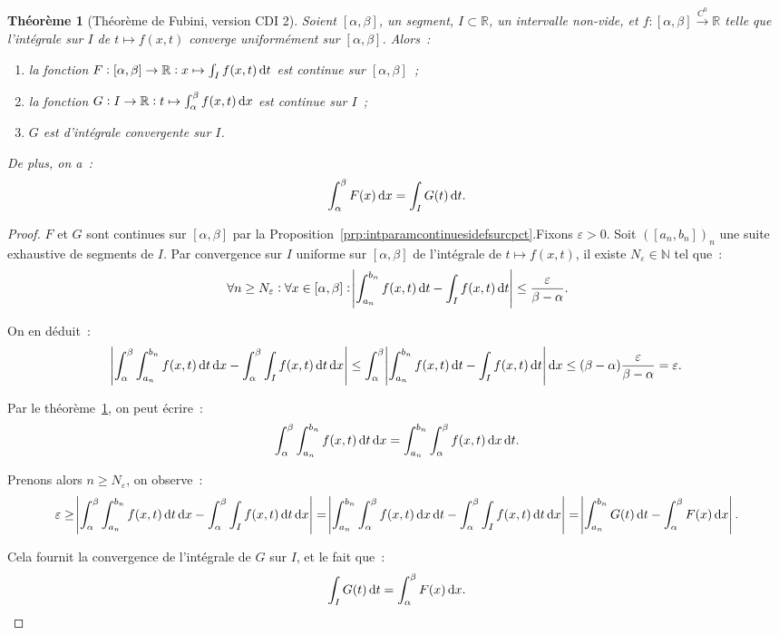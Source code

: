 \documentclass{report}
\newtheorem{thm}{Théorème}[chapter]
\theoremstyle{definition}
\theoremstyle{remark}
\newcommand{\R}{\mathbb R}
\newcommand{\N}{\mathbb N}
\newcommand{\toC}[1]{\xrightarrow{C^{#1}}}
\newcommand{\tocont}{\toC 0}
\newcommand{\CDIII}{{CDI 2}}
\begin{document}
			\begin{thm}[Théorème de Fubini, version \CDIII]\label{thm:FubiniCDI1} Soient $[\alpha, \beta]$, un segment, $I \subset \R$, un intervalle non-vide, et
			$f : [\alpha, \beta] \tocont \R$ telle que l'intégrale sur $I$ de $t \mapsto f(x, t)$ converge uniformément sur $[\alpha, \beta]$. Alors~:
			\begin{enumerate}
				\item la fonction $F : [\alpha, \beta] \to \R : x \mapsto \int_I f(x, t)\dif t$ est continue sur $[\alpha, \beta]$~;
				\item la fonction $G : I \to \R : t \mapsto \int_\alpha^\beta f(x, t)\dif x$ est continue sur $I$~;
				\item $G$ est d'intégrale convergente sur $I$.
			\end{enumerate}

			De plus, on a~:
			\[\int_\alpha^\beta F(x)\dif x = \int_I G(t)\dif t.\]
			\end{thm}

			\begin{proof} $F$ et $G$ sont continues sur $[\alpha, \beta]$ par la Proposition~\ref{prp:intparamcontinuesidefsurcpct}.Fixons $\varepsilon > 0$.
			Soit $([a_n, b_n])_n$ une suite exhaustive de segments de $I$. Par convergence sur $I$ uniforme sur $[\alpha, \beta]$ de l'intégrale de
			$t \mapsto f(x, t)$, il existe $N_\varepsilon \in \N$ tel que~:
			\[\forall n \geq N_\varepsilon : \forall x \in [\alpha, \beta] : \abs {\int_{a_n}^{b_n} f(x, t)\dif t - \int_I f(x, t)\dif t}
				\leq \frac \varepsilon{\beta-\alpha}.\]

			On en déduit~:
			\[\abs {\int_\alpha^\beta\int_{a_n}^{b_n} f(x, t)\dif t\dif x - \int_\alpha^\beta\int_I f(x, t)\dif t\dif x}
				\leq \int_\alpha^\beta\abs {\int_{a_n}^{b_n}f(x, t)\dif t - \int_I f(x, t)\dif t}\dif x
				\leq (\beta-\alpha)\frac \varepsilon{\beta-\alpha} = \varepsilon.\]

			Par le théorème~\ref{thm:FubiniCDI1}, on peut écrire~:
			\[\int_\alpha^\beta\int_{a_n}^{b_n}f(x, t)\dif t\dif x = \int_{a_n}^{b_n}\int_\alpha^\beta f(x, t)\dif x\dif t.\]

			Prenons alors $n \geq N_\varepsilon$, on observe~:
			\[\varepsilon \geq \abs {\int_\alpha^\beta\int_{a_n}^{b_n} f(x, t)\dif t\dif x - \int_\alpha^\beta\int_I f(x, t)\dif t\dif x}
				= \abs {\int_{a_n}^{b_n}\int_\alpha^\beta f(x, t)\dif x\dif t - \int_\alpha^\beta\int_I f(x, t)\dif t\dif x}
				= \abs {\int_{a_n}^{b_n}G(t)\dif t - \int_\alpha^\beta F(x)\dif x}.\]

			Cela fournit la convergence de l'intégrale de $G$ sur $I$, et le fait que~:
			\[\int_I G(t)\dif t = \int_\alpha^\beta F(x)\dif x.\]
			\end{proof}
\end{document}
